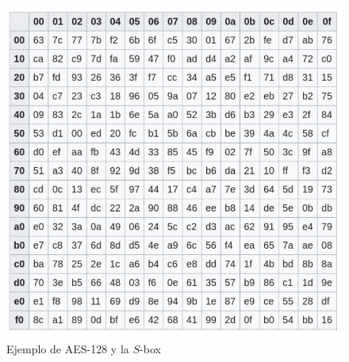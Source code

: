 \begin{figure}[H]
    \includegraphics[scale=0.5]{img/cap4/4.png}
    \caption{Ejemplo de AES-128 y la $S$-box}
\end{figure}
